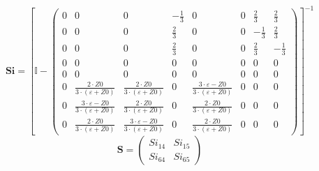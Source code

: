 \[ \mathbf{Si} = \left[ \mathbb{I}  - \left(\begin{array}{cccccccc} 0 & 0 & 0 & -\frac{1}{3} & 0 & 0 & \frac{2}{3} & \frac{2}{3} \\ 0 & 0 & 0 & \frac{2}{3} & 0 & 0 & -\frac{1}{3} & \frac{2}{3} \\ 0 & 0 & 0 & \frac{2}{3} & 0 & 0 & \frac{2}{3} & -\frac{1}{3} \\ 0 & 0 & 0 & 0 & 0 & 0 & 0 & 0 \\ 0 & 0 & 0 & 0 & 0 & 0 & 0 & 0 \\ 0 & \frac{2\cdot Z0}{3\cdot \left(\varepsilon+Z0\right)} & \frac{2\cdot Z0}{3\cdot \left(\varepsilon+Z0\right)} & 0 & \frac{3\cdot \varepsilon-Z0}{3\cdot \left(\varepsilon+Z0\right)} & 0 & 0 & 0 \\ 0 & \frac{3\cdot \varepsilon-Z0}{3\cdot \left(\varepsilon+Z0\right)} & \frac{2\cdot Z0}{3\cdot \left(\varepsilon+Z0\right)} & 0 & \frac{2\cdot Z0}{3\cdot \left(\varepsilon+Z0\right)} & 0 & 0 & 0 \\ 0 & \frac{2\cdot Z0}{3\cdot \left(\varepsilon+Z0\right)} & \frac{3\cdot \varepsilon-Z0}{3\cdot \left(\varepsilon+Z0\right)} & 0 & \frac{2\cdot Z0}{3\cdot \left(\varepsilon+Z0\right)} & 0 & 0 & 0 \end{array}\right) \right]^{-1} \]
\[ \mathbf{S} = \left(\begin{array}{cc} Si_{14} & Si_{15} \\ Si_{64} & Si_{65} \end{array}\right) \]
